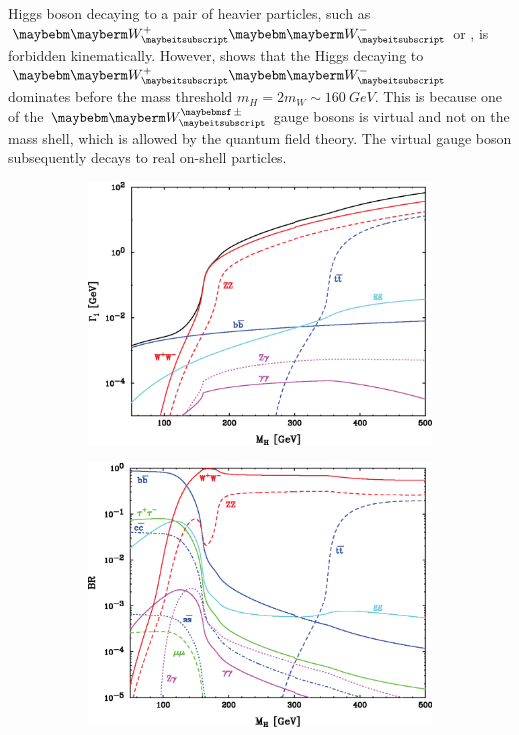 Higgs boson decaying to a pair of heavier particles, such as $\PWp\PWm$ or \PZ\PZ, is forbidden kinematically. However,  shows that the Higgs decaying to  $\PWp\PWm$  dominates before the mass threshold $m_H = 2m_W \sim 160 \ GeV$. This is because one of the $\PWpm$ gauge bosons is virtual and not on the mass shell, which is allowed by the quantum field theory. The virtual gauge boson subsequently decays to real on-shell particles.

\begin{figure}[tbph]
\centering
    \begin{subfigure}[b]{0.45\textwidth}
        \includegraphics[width=\textwidth]{theory/HiggsDecayWidth}
        \caption{}
        \label{fig:theoryHiggsDecayWidth}
    \end{subfigure}
    \begin{subfigure}[b]{0.45\textwidth}
        \includegraphics[width=\textwidth]{theory/HiggsBranchingRatio}

\end{subfigure}
\end{figure}
